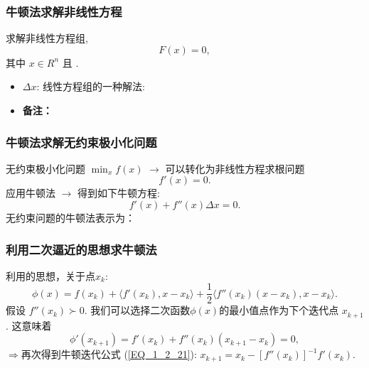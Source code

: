 \documentclass[handout,10pt]{beamer} %
\begin{document}
\begin{frame}[fragile]
\frametitle{牛顿法求解非线性方程}


 求解非线性方程组,
$$
    F(x) = 0,
$$
其中 $x \in R^n$ 且 .

\begin{itemize}
  \item
   $\Delta x$: 线性方程组的一种解法:
\item
\textbf{备注：}

\end{itemize}




\end{frame}

\begin{frame}[fragile]
\frametitle{牛顿法求解无约束极小化问题}



  无约束极小化问题 $\min_x f(x)$
$\longrightarrow$ 可以转化为非线性方程求根问题
\begin{equation}\label{EQ_1_2_20}
    f'(x) = 0.
\end{equation}
  应用牛顿法 $\rightarrow$
得到如下牛顿方程:
$$
    f'(x) + f''(x)\Delta x = 0.
$$
 无约束问题的牛顿法表示为：


\end{frame}

\begin{frame}[fragile]
\frametitle{利用二次逼近的思想求牛顿法}

 利用的思想，关于点$x_k$:
$$
    \phi(x) = f(x_k) + \langle f'(x_k),x-x_k\rangle + \frac{1}{2} \langle f''(x_k)(x-x_k), x-x_k\rangle.
$$
假设 $f''(x_k) \succ 0$. 我们可以选择二次函数$\phi(x)$的最小值点作为下个迭代点 $x_{k+1}^{}$ . 这意味着
$$
    \phi'(x_{k+1}^{}) = f'(x_k) + f''(x_k) (x_{k+1}^{} - x_k) = 0,
$$
$\Rightarrow$再次得到牛顿迭代公式 (\ref{EQ_1_2_21}): $x_{k+1}^{} = x_k - [f''(x_k)]_{}^{-1} f'(x_k)$.


\end{frame}
\end{document}
